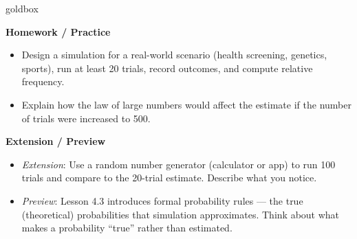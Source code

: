 \documentclass[10pt]{article}
\begin{document}
\begin{skillbox}{goldbox}
\begin{minipage}[t]{0.48\linewidth}
    \textbf{Homework / Practice}
    \begin{itemize}
        \item Design a simulation for a real-world scenario (health screening, genetics,
              sports), run at least 20 trials, record outcomes, and compute relative
              frequency.
        \item Explain how the law of large numbers would affect the estimate if the number
              of trials were increased to 500.
    \end{itemize}
\end{minipage}
\hfill
\begin{minipage}[t]{0.48\linewidth}
    \textbf{Extension / Preview}
    \begin{itemize}
        \item \textit{Extension}: Use a random number generator (calculator or app) to
              run 100 trials and compare to the 20-trial estimate. Describe what you notice.
        \item \textit{Preview}: Lesson 4.3 introduces formal probability rules --- the
              true (theoretical) probabilities that simulation approximates. Think about what
              makes a probability ``true'' rather than estimated.
    \end{itemize}
\end{minipage}
\end{skillbox}
\end{document}

